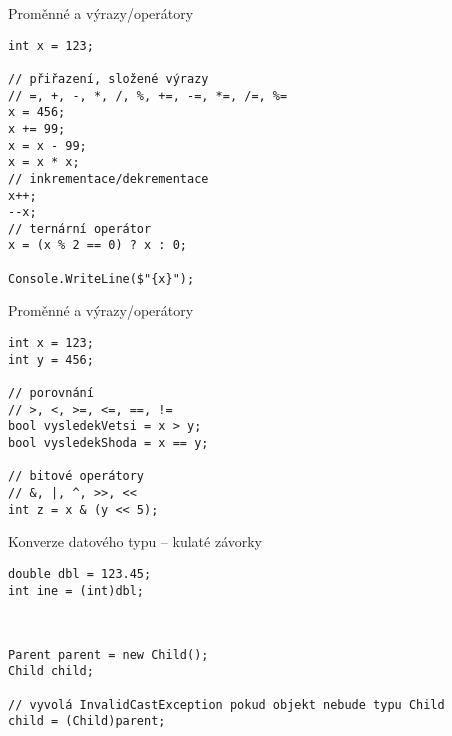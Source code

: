 

\begin{frame}[fragile]
\begin{exampleblock}{Proměnné a výrazy/operátory}
\begin{lstlisting}
int x = 123;

// přiřazení, složené výrazy
// =, +, -, *, /, %, +=, -=, *=, /=, %=
x = 456;
x += 99;
x = x - 99;
x = x * x;
// inkrementace/dekrementace
x++;
--x;
// ternární operátor
x = (x % 2 == 0) ? x : 0;

Console.WriteLine($"{x}");
\end{lstlisting}
\end{exampleblock}
\end{frame}


\begin{frame}[fragile]
\begin{exampleblock}{Proměnné a výrazy/operátory}
\begin{lstlisting}
int x = 123;
int y = 456;

// porovnání
// >, <, >=, <=, ==, !=
bool vysledekVetsi = x > y;
bool vysledekShoda = x == y;

// bitové operátory
// &, |, ^, >>, <<
int z = x & (y << 5);

\end{lstlisting}
\end{exampleblock}
\end{frame}



\begin{frame}[fragile]
\begin{exampleblock}{Konverze datového typu -- kulaté závorky}
\begin{lstlisting}[basicstyle=\small]
double dbl = 123.45;
int ine = (int)dbl;
\end{lstlisting}
\end{exampleblock}

\begin{exampleblock}{~}
\begin{lstlisting}[basicstyle=\small]
Parent parent = new Child();
Child child;

// vyvolá InvalidCastException pokud objekt nebude typu Child
child = (Child)parent; 
\end{lstlisting}
\end{exampleblock}
\end{frame}





